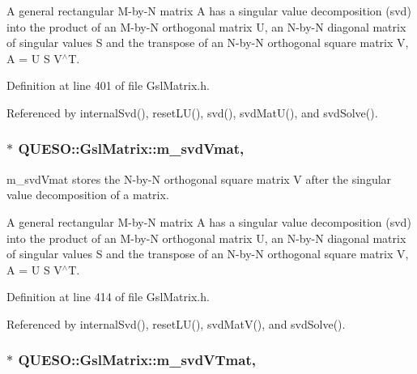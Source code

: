 A general rectangular M-\/by-\/\-N matrix A has a singular value decomposition (svd) into the product of an M-\/by-\/\-N orthogonal matrix U, an N-\/by-\/\-N diagonal matrix of singular values S and the transpose of an N-\/by-\/\-N orthogonal square matrix V, A = U S V$^\wedge$\-T. 

Definition at line 401 of file Gsl\-Matrix.\-h.



Referenced by internal\-Svd(), reset\-L\-U(), svd(), svd\-Mat\-U(), and svd\-Solve().

\hypertarget{class_q_u_e_s_o_1_1_gsl_matrix_a13355e2467b03cf8ff514659802794e0}{
\subsubsection[{m\-\_\-svd\-Vmat}]{$\ast$ Q\-U\-E\-S\-O\-::\-Gsl\-Matrix\-::m\-\_\-svd\-Vmat\hspace{0.3cm}{\ttfamily [mutable]}, {\ttfamily [private]}}}\label{class_q_u_e_s_o_1_1_gsl_matrix_a13355e2467b03cf8ff514659802794e0}


m\-\_\-svd\-Vmat stores the N-\/by-\/\-N orthogonal square matrix V after the singular value decomposition of a matrix. 

A general rectangular M-\/by-\/\-N matrix A has a singular value decomposition (svd) into the product of an M-\/by-\/\-N orthogonal matrix U, an N-\/by-\/\-N diagonal matrix of singular values S and the transpose of an N-\/by-\/\-N orthogonal square matrix V, A = U S V$^\wedge$\-T. 

Definition at line 414 of file Gsl\-Matrix.\-h.



Referenced by internal\-Svd(), reset\-L\-U(), svd\-Mat\-V(), and svd\-Solve().

\hypertarget{class_q_u_e_s_o_1_1_gsl_matrix_a5aca6b693035268ddcd679affc465d47}{
\subsubsection[{m\-\_\-svd\-V\-Tmat}]{$\ast$ Q\-U\-E\-S\-O\-::\-Gsl\-Matrix\-::m\-\_\-svd\-V\-Tmat\hspace{0.3cm}{\ttfamily [mutable]}, {\ttfamily [private]}}}\label{class_q_u_e_s_o_1_1_gsl_matrix_a5aca6b693035268ddcd679affc465d47}


